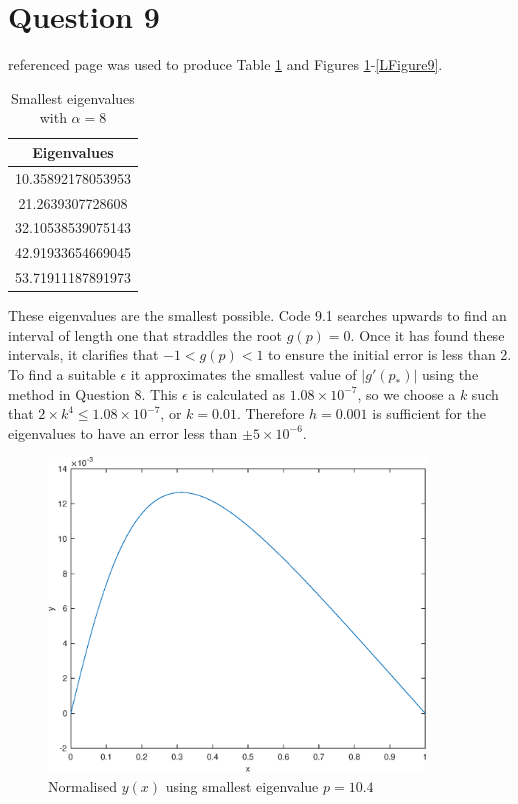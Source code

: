 \documentclass[10pt,a4paper,notitlepage]{article}
\newcommand{\abs}[1]{\lvert#1\rvert}
\begin{document}
\section*{\centering \large Question 9}
 referenced page \pageref{subsec:Code 9.1} was used to produce Table \ref{5Eigenvals} and Figures \ref{FFigure9}-\ref{LFigure9}.
\begin{table}[H]
\centering
\begin{tabular}{|c|}
\hline Eigenvalues\\ \hline 10.35892178053953\\ 21.2639307728608\\ 32.10538539075143\\ 42.91933654669045\\ 53.71911187891973\\ \hline \end{tabular}
\caption{Smallest eigenvalues with $\alpha=8$}\label{5Eigenvals}
\end{table}
These eigenvalues are the smallest possible. Code 9.1 searches upwards to find an interval of length one that straddles the root $g(p)=0$. Once it has found these intervals, it clarifies that $-1<g(p)<1$ to ensure the initial error is less than 2. To find a suitable $\epsilon$ it approximates the smallest value of $\abs{g'(p_{*})}$ using the method in Question 8. This $\epsilon$ is calculated as $1.08\times 10^{-7}$, so we choose a $k$ such that $2\times k^{4}\leq 1.08\times 10^{-7}$, or $k=0.01$. Therefore $h=0.001$ is sufficient for the eigenvalues to have an error less than $\pm5\times 10^{-6}$.
\begin{figure}[H]
\begin{center}
\includegraphics[width=10cm]{Image_9_1}
\caption{Normalised $y(x)$ using smallest eigenvalue $p=10.4$}\label{FFigure9}
\end{center}
\end{figure}
\end{document}
